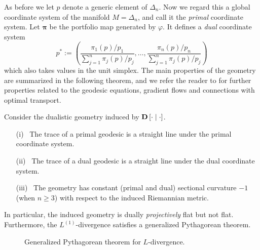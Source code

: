 \documentclass[graybox]{svmult}
\begin{document}
As before we let $p$ denote a generic element of $\Delta_n$. Now we regard this a global coordinate system of the manifold $M = \Delta_n$, and call it the {\it primal} coordinate system. Let $\boldsymbol{\pi}$ be the portfolio map generated by $\varphi$. It defines a {\it dual} coordinate system
\[
p^* := \left( \frac{\pi_1(p)/p_1}{\sum_{j = 1}^n \pi_j(p)/p_j}, \ldots, \frac{\pi_n(p)/p_n}{\sum_{j = 1}^n \pi_j(p)/p_j} \right)
\]
which also takes values in the unit simplex. The main properties of the geometry are summarized in the following theorem, and we refer the reader to \cite{PW16, W17b} for further properties related to the geodesic equations, gradient flows and connections with optimal transport.

\begin{theorem} \cite{PW16}
Consider the dualistic geometry induced by ${\bf D}\left[ \cdot \mid \cdot\right]$.
\begin{itemize}
\item[(i)] \ The trace of a primal geodesic is a straight line under the primal coordinate system.
\item[(ii)] \ The trace of a dual geodesic is a straight line under the dual coordinate system.
\item[(iii)] \ The geometry has constant (primal and dual) sectional curvature $-1$ (when $n \geq 3$) with respect to the induced Riemannian metric.
\end{itemize}
\end{theorem}

In particular, the induced geometry is dually {\it projectively} flat but not flat. Furthermore, the $L^{(1)}$-divergence satisfies a generalized Pythagorean theorem.

\begin{figure}[t!]
\centering
{}
\caption{Generalized Pythagorean theorem for $L$-divergence.} \label{fig:pyth}
\end{figure}
\end{document}
